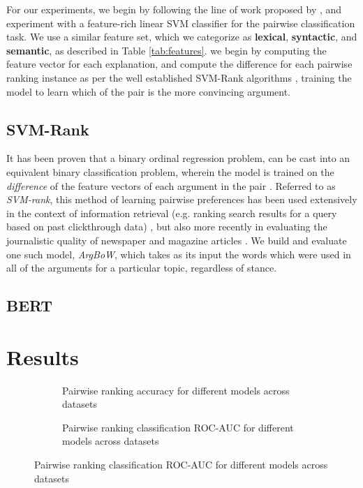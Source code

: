 \documentclass[runningheads]{llncs}
\begin{document}
For our experiments, we begin by following the line of work proposed by 
\cite{habernal_which_2016}, and experiment with a feature-rich linear SVM 
classifier for the pairwise classification task. We use a similar feature set, 
which we categorize as \textbf{lexical}, \textbf{syntactic}, and 
\textbf{semantic}, as described in Table \ref{tab:features}. we begin by 
computing the feature vector for each explanation, and compute the difference 
for each pairwise ranking instance as per the well established SVM-Rank 
algorithms \cite{joachims_optimizing_2002}, training the model to learn which 
of the pair is the more convincing argument. 



\subsection{SVM-Rank}
It has been proven that a binary ordinal regression problem, can be cast into 
an equivalent binary classification problem, wherein the model is trained on 
the \textit{difference} of the feature vectors of each argument in the pair 
\cite{herbrich_support_1999}. Referred to as \textit{SVM-rank}, this method of 
learning pairwise preferences has been used extensively in the context of 
information retrieval (e.g. ranking search results for a query based on past 
clickthrough data) \cite{joachims_optimizing_2002}, but also more recently in 
evaluating the journalistic quality of newspaper and magazine articles 
\cite{louis_what_2013}. We build and evaluate one such model, \textit{ArgBoW}, 
which takes as its input the words which were used in all of the arguments for 
a particular topic, regardless of stance. 

\subsection{BERT}


\section{Results}


\begin{figure}
	\begin{subfigure}[t]{0.5\linewidth}
		\centering
		\scalebox{0.5}{}

		\caption{Pairwise ranking accuracy for different models across datasets}
	\end{subfigure}%
	\qquad
	\begin{subfigure}[t]{0.5\linewidth}
		\centering
		\scalebox{0.5}{}

		\caption{Pairwise ranking classification ROC-AUC for different models 
		across datasets}
	\end{subfigure}
\end{figure}
\end{document}
